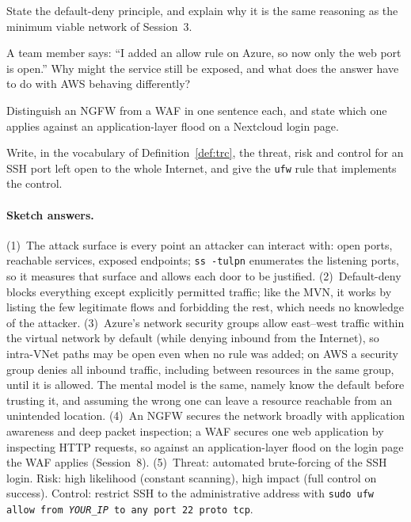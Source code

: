 \begin{exercise}
State the default-deny principle, and explain why it is the same reasoning as
the minimum viable network of Session~3.
\end{exercise}

\begin{exercise}
A team member says: ``I added an allow rule on Azure, so now only the web port
is open.'' Why might the service still be exposed, and what does the answer
have to do with AWS behaving differently?
\end{exercise}

\begin{exercise}
Distinguish an NGFW from a WAF in one sentence each, and state which one
applies against an application-layer flood on a Nextcloud login page.
\end{exercise}

\begin{exercise}
Write, in the vocabulary of Definition~\ref{def:trc}, the threat, risk and
control for an SSH port left open to the whole Internet, and give the
\texttt{ufw} rule that implements the control.
\end{exercise}

\paragraph{Sketch answers.}
{\small
(1)~The attack surface is every point an attacker can interact with: open
ports, reachable services, exposed endpoints; \texttt{ss -tulpn} enumerates the
listening ports, so it measures that surface and allows each door to be
justified. (2)~Default-deny blocks everything except explicitly permitted
traffic; like the MVN, it works by listing the few legitimate flows and
forbidding the rest, which needs no knowledge of the attacker. (3)~Azure's
network security groups allow east--west traffic within the virtual network by
default (while denying inbound from the Internet), so intra-VNet paths may be
open even when no rule was added; on AWS a security group denies all inbound
traffic, including between resources in the same group, until it is allowed.
The mental model is the same, namely know the default before trusting it, and
assuming the wrong one can leave a resource reachable from an unintended
location. (4)~An NGFW secures the network broadly with application awareness
and deep packet inspection; a WAF secures one web application by inspecting
HTTP requests, so against an application-layer flood on the login page the WAF
applies (Session~8). (5)~Threat: automated brute-forcing of the SSH login.
Risk: high likelihood (constant scanning), high impact (full control on
success). Control: restrict SSH to the administrative address with
\texttt{sudo ufw allow from \emph{YOUR\_IP} to any port 22 proto tcp}.}


